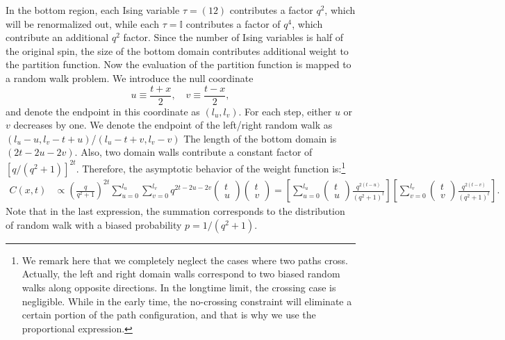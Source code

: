 \documentclass[aps,prb,superscriptaddress,nofootinbib]{revtex4}
\begin{document}
In the bottom region, each Ising variable $\tau = (12)$ contributes a factor $q^2$, which will be renormalized out, while each $\tau=\mathbb I$ contributes a factor of $q^4$, which contribute an additional $q^2$ factor.
Since the number of Ising variables is half of the original spin, the size of the bottom domain contributes additional weight to the partition function.
Now the evaluation of the partition function is mapped to a random walk problem.
We introduce the null coordinate
\begin{equation}
	u \equiv \frac{t+x}{2}, \quad 
	v \equiv \frac{t-x}{2},
\end{equation}
and denote the endpoint in this coordinate as $(l_u, l_v)$.
For each step, either $u$ or $v$ decreases by one.
We denote the endpoint of the left/right random walk as $(l_u-u,l_v-t+u)$/$(l_u-t+v,l_v-v)$
The length of the bottom domain is $(2t-2u-2v)$.
Also, two domain walls contribute a constant factor of $\left[q/(q^2+1)\right]^{2t}$.
Therefore, the asymptotic behavior of the weight function is:\footnote{We remark here that we completely neglect the cases where two paths cross. 
Actually, the left and right domain walls correspond to two biased random walks along opposite directions. 
In the longtime limit, the crossing case is negligible.
While in the early time, the no-crossing constraint will eliminate a certain portion of the path configuration, and that is why we use the proportional expression.}
\begin{equation}
\begin{aligned}
	C(x,t) &\propto \left(\frac{q}{q^2+1}\right)^{2t}\sum_{u=0}^{l_u} \sum_{v=0}^{l_v} q^{2t-2u-2v} 
	\begin{pmatrix} t \\ u \end{pmatrix} \begin{pmatrix} t \\ v \end{pmatrix} 
	= \left[\sum_{u=0}^{l_u}\begin{pmatrix} t \\ u \end{pmatrix} \frac{q^{2(t-u)}}{(q^2+1)^t} \right]
	\left[\sum_{v=0}^{l_v}\begin{pmatrix} t \\ v \end{pmatrix} \frac{q^{2(t-v)}}{(q^2+1)^t} \right].
\end{aligned}
\end{equation}
Note that in the last expression, the summation corresponds to the distribution of random walk with a biased probability $p = 1/(q^2+1)$.
\end{document}
